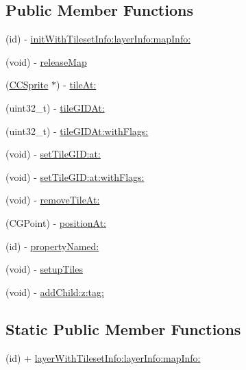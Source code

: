\subsection*{Public Member Functions}
\begin{DoxyCompactItemize}
\item 
(id) -\/ \hyperlink{interface_c_c_t_m_x_layer_a33a9fb3afbeaff1c7c944871cc36dc8e}{init\-With\-Tileset\-Info\-:layer\-Info\-:map\-Info\-:}
\item 
(void) -\/ \hyperlink{interface_c_c_t_m_x_layer_a6da51144eb6bc5fbdb10cecb1dd9dd95}{release\-Map}
\item 
(\hyperlink{class_c_c_sprite}{C\-C\-Sprite} $\ast$) -\/ \hyperlink{interface_c_c_t_m_x_layer_acf0ee39e7670ebf4cd0dcd806c0b0897}{tile\-At\-:}
\item 
(uint32\-\_\-t) -\/ \hyperlink{interface_c_c_t_m_x_layer_a22f4a950562db2473c188df39e5fc89c}{tile\-G\-I\-D\-At\-:}
\item 
(uint32\-\_\-t) -\/ \hyperlink{interface_c_c_t_m_x_layer_afe712473b73e0d12d132cf8fc0c49436}{tile\-G\-I\-D\-At\-:with\-Flags\-:}
\item 
(void) -\/ \hyperlink{interface_c_c_t_m_x_layer_a040599b66314082e02b3a7fbb923eca9}{set\-Tile\-G\-I\-D\-:at\-:}
\item 
(void) -\/ \hyperlink{interface_c_c_t_m_x_layer_af5a1be12e5457e4d3e54894953a0e041}{set\-Tile\-G\-I\-D\-:at\-:with\-Flags\-:}
\item 
(void) -\/ \hyperlink{interface_c_c_t_m_x_layer_a776ac1404ff793782b5dcf55a3025909}{remove\-Tile\-At\-:}
\item 
(C\-G\-Point) -\/ \hyperlink{interface_c_c_t_m_x_layer_ac8b24455f15f4ec4ad9f7c46dcfa2ba3}{position\-At\-:}
\item 
(id) -\/ \hyperlink{interface_c_c_t_m_x_layer_a93cde7e27d79b8471ae7022ca8f3477d}{property\-Named\-:}
\item 
(void) -\/ \hyperlink{interface_c_c_t_m_x_layer_a2907ea3d49257923efeccd65803f8862}{setup\-Tiles}
\item 
(void) -\/ \hyperlink{interface_c_c_t_m_x_layer_a898f8a54b02cc7cdfc9236177d93a2c0}{add\-Child\-:z\-:tag\-:}
\end{DoxyCompactItemize}
\subsection*{Static Public Member Functions}
\begin{DoxyCompactItemize}
\item 
(id) + \hyperlink{interface_c_c_t_m_x_layer_a77aae0dac98b55e7dd6bfc80e9338e52}{layer\-With\-Tileset\-Info\-:layer\-Info\-:map\-Info\-:}
\end{DoxyCompactItemize}
